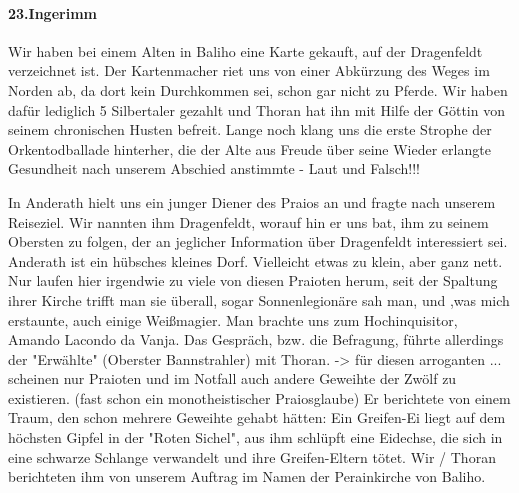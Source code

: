 \documentclass[11pt]{scrreprt}
\begin{document}
\paragraph{23.Ingerimm}

Wir haben bei einem Alten in Baliho eine Karte gekauft, auf der Dragenfeldt  verzeichnet ist. Der Kartenmacher riet uns von einer Abkürzung des Weges im Norden ab, da dort kein Durchkommen sei, schon gar nicht zu Pferde. Wir haben dafür lediglich 5 Silbertaler gezahlt und Thoran hat ihn mit Hilfe der Göttin von seinem chronischen Husten befreit. Lange noch klang uns die erste Strophe der Orkentodballade hinterher, die der Alte aus Freude über seine Wieder erlangte Gesundheit nach unserem Abschied anstimmte - Laut und Falsch!!!\par

In Anderath hielt uns ein junger Diener des Praios an und fragte nach unserem Reiseziel. Wir nannten ihm Dragenfeldt, worauf hin er uns bat, ihm zu seinem Obersten zu folgen, der an jeglicher Information über Dragenfeldt  interessiert sei. Anderath ist ein hübsches kleines Dorf. Vielleicht etwas zu klein, aber ganz nett. Nur laufen hier irgendwie zu viele von diesen Praioten herum, seit der Spaltung ihrer Kirche trifft man sie überall, sogar Sonnenlegionäre sah man, und ,was mich erstaunte, auch einige Weißmagier. Man brachte uns zum Hochinquisitor, Amando Lacondo da Vanja. Das Gespräch, bzw. die Befragung, führte allerdings der "Erwählte" (Oberster Bannstrahler) mit Thoran. -> für diesen arroganten ... scheinen nur Praioten und im Notfall auch andere Geweihte der Zwölf zu existieren. (fast schon ein monotheistischer Praiosglaube) Er berichtete von einem Traum, den schon mehrere Geweihte gehabt hätten: Ein Greifen-Ei liegt auf dem höchsten Gipfel in der "Roten Sichel", aus ihm schlüpft eine Eidechse, die sich in eine schwarze Schlange verwandelt und ihre Greifen-Eltern tötet. Wir / Thoran berichteten ihm von unserem Auftrag im Namen der Perainkirche von Baliho. \par
\end{document}
